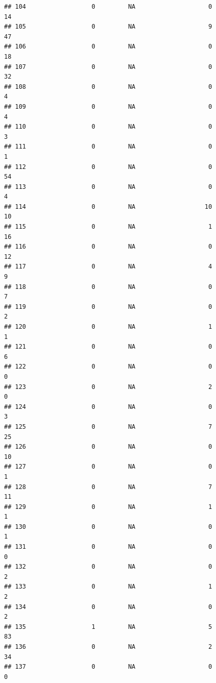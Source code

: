 \documentclass[
]{article}
\begin{document}
\begin{verbatim}
## 104                  0         NA                    0                 14
## 105                  0         NA                    9                 47
## 106                  0         NA                    0                 18
## 107                  0         NA                    0                 32
## 108                  0         NA                    0                  4
## 109                  0         NA                    0                  4
## 110                  0         NA                    0                  3
## 111                  0         NA                    0                  1
## 112                  0         NA                    0                 54
## 113                  0         NA                    0                  4
## 114                  0         NA                   10                 10
## 115                  0         NA                    1                 16
## 116                  0         NA                    0                 12
## 117                  0         NA                    4                  9
## 118                  0         NA                    0                  7
## 119                  0         NA                    0                  2
## 120                  0         NA                    1                  1
## 121                  0         NA                    0                  6
## 122                  0         NA                    0                  0
## 123                  0         NA                    2                  0
## 124                  0         NA                    0                  3
## 125                  0         NA                    7                 25
## 126                  0         NA                    0                 10
## 127                  0         NA                    0                  1
## 128                  0         NA                    7                 11
## 129                  0         NA                    1                  1
## 130                  0         NA                    0                  1
## 131                  0         NA                    0                  0
## 132                  0         NA                    0                  2
## 133                  0         NA                    1                  2
## 134                  0         NA                    0                  2
## 135                  1         NA                    5                 83
## 136                  0         NA                    2                 34
## 137                  0         NA                    0                  0

\end{verbatim}
\end{document}
